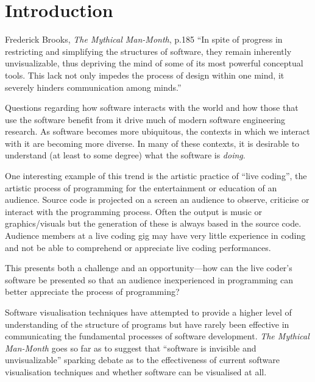
\chapter{Introduction}
\label{chap:introduction}

\begin{chapquote}{Frederick Brooks, \textit{The Mythical Man-Month}, p.185}
``In spite of progress in restricting and simplifying the structures of software, they remain inherently unvisualizable, thus depriving the mind of some of its most powerful conceptual tools. This lack not only impedes the process of design within one mind, it severely hinders communication among minds.''
\end{chapquote}


Questions regarding how software interacts with the world and how
those that use the software benefit from it drive much of modern
software engineering research. As software becomes more ubiquitous,
the contexts in which we interact with it are becoming more diverse.
In many of these contexts, it is desirable to understand (at least to
some degree) what the software is \emph{doing}.

One interesting example of this trend is the artistic practice of
``live coding''\cite{TODO}, the artistic process of programming for
the entertainment or education of an audience. Source code is
projected on a screen an audience to observe, criticise or interact
with the programming process. Often the output is music or
graphics/visuals but the generation of these is always based in the
source code. Audience members at a live coding gig may have very
little experience in coding and not be able to comprehend or
appreciate live coding performances.

This presents both a challenge and an opportunity---how can the live
coder's software be presented so that an audience inexperienced in
programming can better appreciate the process of programming?

Software visualisation techniques have attempted to provide a higher
level of understanding of the structure of programs but have rarely
been effective in communicating the fundamental processes of software
development. \textit{The Mythical Man-Month} goes so far as to suggest
that ``software is invisible and unvisualizable''\cite{Brooks1995}
sparking debate as to the effectiveness of current software
visualisation techniques and whether software can be visualised at
all.

